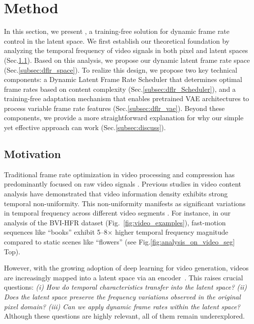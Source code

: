 

\section{Method}
In this section, we present \dlfr, a training-free solution for dynamic frame rate control in the latent space. We first establish our theoretical foundation by analyzing the temporal frequency of video signals in both pixel and latent spaces (Sec.\ref{subsec:motivation}). Based on this analysis, we propose our dynamic latent frame rate space (Sec.\ref{subsec:dflr_space}). To realize this design, we propose two key technical components: \raisebox{-1.1pt}{\ding[1.1]{182\relax}} a Dynamic Latent Frame Rate Scheduler that determines optimal frame rates based on content complexity (Sec.\ref{subsec:dflr_Scheduler}), and \raisebox{-1.1pt}{\ding[1.1]{183\relax}} a training-free adaptation mechanism that enables pretrained VAE architectures to process variable frame rate features (Sec.\ref{subsec:dflr_vae}).
Beyond these components, we provide a more straightforward explanation for why our simple yet effective approach can work (Sec.\ref{subsec:discuss}).



\subsection{Motivation}
\label{subsec:motivation}
Traditional frame rate optimization in video processing and compression has predominantly focused on raw video signals \cite{song2001rate,mackin2015study}. Previous studies in video content analysis have demonstrated that video information density exhibits strong temporal non-uniformity. This non-uniformity manifests as significant variations in temporal frequency across different video segments \cite{menon2022vca,papakonstantinou2023content}. 
For instance, in our analysis of the BVI-HFR dataset (Fig.~\ref{fig:video_examples}), fast-motion sequences like ``books'' exhibit 5--8× higher temporal frequency magnitude compared to static scenes like ``flowers'' (see Fig.\ref{fig:analysis_on_video_seg} Top). 

However, with the growing adoption of deep learning for video generation, videos are increasingly mapped into a latent space via an encoder~\cite{fan2024fluid,kuaishou2024,zheng2024open,kong2024hunyuanvideo}. This raises crucial questions: \textit{(i) How do temporal characteristics transfer into the latent space? (ii) Does the latent space preserve the frequency variations observed in the original pixel domain? (iii) Can we apply dynamic frame rates within the latent space?} Although these questions are highly relevant, all of them remain underexplored.




